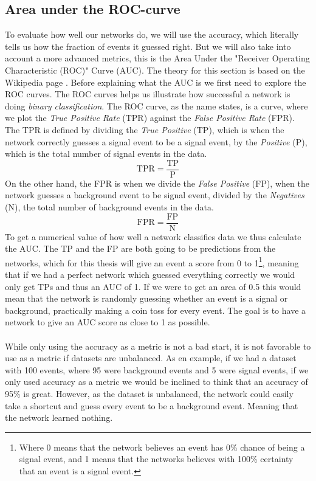 \documentclass[12pt, a4paper]{book}
\begin{document}
\subsection{Area under the ROC-curve}
To evaluate how well our networks do, we will use the accuracy, which literally tells us how the fraction of events it guessed right. But we will also take into account a more advanced metrics, this is the Area Under the "Receiver Operating Characteristic (ROC)" Curve (AUC). The theory for this section is based on the Wikipedia page \cite{roc_wikipedia}.
Before explaining what the AUC is we first need to explore the ROC curves. The ROC curves helps us illustrate how successful a network is doing \textit{binary classification}. The ROC curve, as the name states, is a curve, where we plot the \textit{True Positive Rate} (TPR) against 
the \textit{False Positive Rate} (FPR). The TPR is defined by dividing the \textit{True Positive} (TP), which is when the network correctly guesses a signal event to be a signal event, by the \textit{Positive} (P), which is the total number of signal events in the data. 
$$
\text{TPR} =\frac{\text{TP}}{\text{P}}
$$
On the other hand, the FPR is when we divide the \textit{False Positive} (FP), when the network guesses a background event to be signal event, divided by the \textit{Negatives} (N), the total number of background events in the data.
$$
\text{FPR} =\frac{\text{FP}}{\text{N}}
$$
To get a numerical value of how well a network classifies data we thus calculate the AUC. The TP and the FP are both going to be predictions from the networks, which for this thesis will give an event a score from 0 to 1\footnote{Where 0 means that the network believes an event has 0\% chance of being a signal event, and 1 means that the networks believes with 100\% certainty that an event is a signal event.}, 
meaning that if we had a perfect network which guessed everything correctly we would only get TPs and thus an AUC of 1. If we were to get an area of 0.5 this would mean that the network is randomly guessing whether an event is a signal or background, practically making a coin toss for every event. 
The goal is to have a network to give an AUC score as close to 1 as possible. \\
\\While only using the accuracy as a metric is not a bad start, it is not favorable to use as a metric if datasets are unbalanced. As en example, if we had a dataset with 100 events, where 95 were background events and 5 were signal events, if we only used accuracy as a metric we would 
be inclined to think that an accuracy of 95\% is great. However, as the dataset is unbalanced, the network could easily take a shortcut and guess every event to be a background event. Meaning that the network learned nothing.
\end{document}
